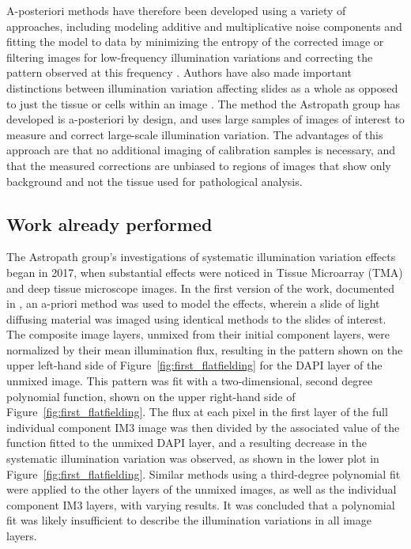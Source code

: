 \documentclass[letterpaper,11pt]{article}
\newcommand{\reffig}[1]{Figure~\ref{#1}}
\begin{document}
A-posteriori methods have therefore been developed using a variety of approaches, including modeling additive and multiplicative noise components and fitting the model to data by minimizing the entropy of the corrected image \cite{PMID:10692132} or filtering images for low-frequency illumination variations and correcting the pattern observed at this frequency \cite{Leong619}. Authors have also made important distinctions between illumination variation affecting slides as a whole as opposed to just the tissue or cells within an image \cite{Carpenter2006}. The method the Astropath group has developed is a-posteriori by design, and uses large samples of images of interest to measure and correct large-scale illumination variation. The advantages of this approach are that no additional imaging of calibration samples is necessary, and that the measured corrections are unbiased to regions of images that show only background and not the tissue used for pathological analysis.

\subsection{Work already performed}
\label{ssec:work_already_performed}

The Astropath group's investigations of systematic illumination variation effects began in 2017, when substantial effects were noticed in Tissue Microarray (TMA) and deep tissue microscope images. In the first version of the work, documented in \cite{Alex_flatfielding_1}, an a-priori method was used to model the effects, wherein a slide of light diffusing material was imaged using identical methods to the slides of interest. The composite image layers, unmixed from their initial component layers, were normalized by their mean illumination flux, resulting in the pattern shown on the upper left-hand side of \reffig{fig:first_flatfielding} for the DAPI layer of the unmixed image. This pattern was fit with a two-dimensional, second degree polynomial function, shown on the upper right-hand side of \reffig{fig:first_flatfielding}. The flux at each pixel in the first layer of the full individual component IM3 image was then divided by the associated value of the function fitted to the unmixed DAPI layer, and a resulting decrease in the systematic illumination variation was observed, as shown in the lower plot in \reffig{fig:first_flatfielding}. Similar methods using a third-degree polynomial fit were applied to the other layers of the unmixed images, as well as the individual component IM3 layers, with varying results. It was concluded that a polynomial fit was likely insufficient to describe the illumination variations in all image layers.
\end{document}
